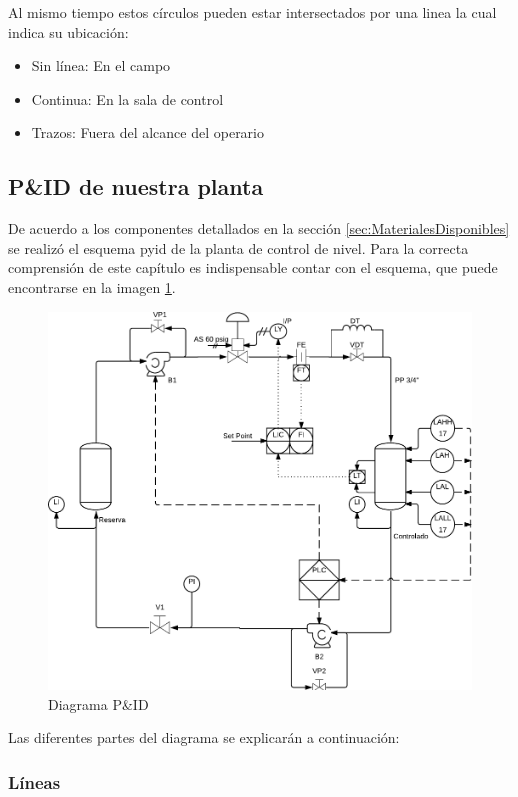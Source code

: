 Al mismo tiempo estos círculos pueden estar intersectados por una linea la cual 
indica su ubicación:

\begin{itemize}
 \item Sin línea: En el campo
 \item Continua: En la sala de control
 \item Trazos: Fuera del alcance del operario
\end{itemize}


\subsection{P\&ID de nuestra planta}
De acuerdo a los componentes detallados en la sección
\ref{sec:MaterialesDisponibles} se realizó el esquema \gls{pyid} de la planta
de control de nivel.
Para la correcta comprensión de este capítulo es indispensable contar con el
esquema, que puede encontrarse en la imagen \ref{img:pyid}.

\begin{figure}
	\centering
\includegraphics[width=\textwidth]{Cap2-DisenoEnsamblado/images/p&id.pdf}
	\caption{Diagrama P\&ID}
	\label{img:pyid}
\end{figure}

Las diferentes partes del diagrama se explicarán a continuación:

\subsubsection{Líneas}

